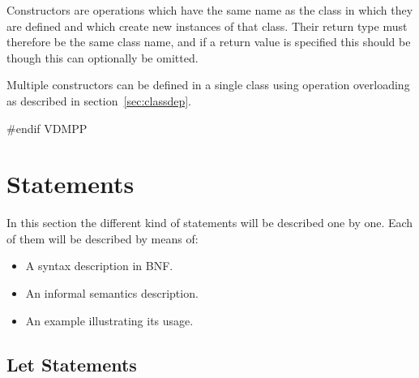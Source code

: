 \documentclass[\pformat,12pt]{article}
\begin{document}
Constructors are operations which have the same name as the class in
which they are defined and which create new instances of that
class. Their return type must therefore be the same class
name, and if a return value is specified this should be 
though this can optionally be omitted.

Multiple constructors can be defined in a single class using
operation overloading as described in section~\ref{sec:classdep}. 

#endif VDMPP

\section{Statements}\label{sec:stmt}

In this section the different kind of statements will be described
one by one. Each of them will be described by means of:
\begin{itemize}
\item A syntax description in BNF.
\item An informal semantics description.
\item An example illustrating its usage.
\end{itemize}

\subsection{Let Statements}\label{letstmt}
\end{document}
